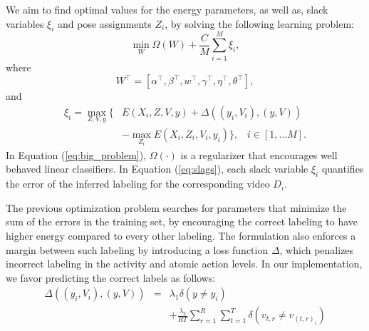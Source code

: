 We aim to find
optimal values for the energy parameters, as well as,
slack variables $\xi_i$ and pose assignments $Z_i$, by solving the following learning problem:
\begin{equation}
\label{eq:big_problem}
\min_{W}    \Omega(W) + \frac{C}{M} \sum_{i=1}^M\xi_i ,
\end{equation}
where
\begin{equation}
W^\top=[\alpha^\top, \beta^\top, w^\top, \gamma^\top, \eta^\top, \theta^\top],
\end{equation}
and
\begin{equation} \label{eq:slags}
\begin{split}
\xi_i = \max_{Z,V,y}  \{  & E(X_i, Z, V, y) + \Delta( (y_i, V_i), (y, V)) \\
 & - \max_{Z_i}{ E(X_i, Z_i, V_i, y_i)} \}, \; \;\; i\in[1,...M].	
\end{split}
\end{equation}
In Equation (\ref{eq:big_problem}),  $\Omega(\cdot)$ is a regularizer that encourages
well behaved linear classifiers. In Equation (\ref{eq:slags}), each slack variable
$\xi_i$ quantifies the error of the inferred labeling for the corresponding video $D_i$.

The previous optimization problem searches for parameters that minimize the sum of the errors in the
training set,
by encouraging the correct labeling to have higher energy compared to every other labeling.
The formulation also enforces a margin between such labeling by introducing a
loss function $\Delta$,
which penalizes incorrect labeling in the activity and atomic action
levels. %
In our implementation, we favor predicting the correct labels %
as follows:
\begin{eqnarray} \label{Eq-Loss}
\Delta( (y_i, V_i), (y, V)) &=&
  \lambda_1 \delta(y \neq y_i) \nonumber \\
&& + \frac{\lambda_2}{RT} \sum_{r=1}^{R}\sum_{t=1}^T \delta(v_{t,r} \neq
v_{{(t,r)}_i}) 
\end{eqnarray}

